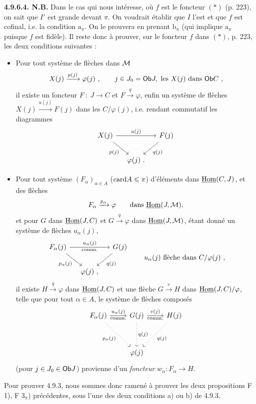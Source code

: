 \textbf{4.9.6.4. N.B.} Dans le cas qui nous intéresse, où $f$ est le foncteur $(*)$ (p. 223), on sait que $I'$ est grande devant $\pi$. On voudrait établir que $I$ l'est et que $f$ est cofinal, i.e. la condition $\mathrm{a}_\pi$. On le prouvera en prenant $\mathrm{b}_\pi$ (qui implique $\mathrm{a}_\pi$ puisque $f$ est fidèle). Il reste donc à
prouver, sur le foncteur $f$ dans $(*)$, p. 223, les deux conditions suivantes :
\begin{itemize}[label={}]
\item[F 1)] Pour tout système de flèches dans $\mathcal{M}$
\[
X(j) \xrightarrow{p(j)} \varphi(j) \ , \qquad j \in J_0 = \mathsf{Ob} J, \text{ les } X(j) \text{ dans } \mathsf{Ob} C \ ,
\]
il existe un foncteur $F \ : \ J \longrightarrow C$ et $F \xrightarrow{q} \varphi$, enfin un système de flèches $X(j) \xrightarrow{u(j)} F(j)$ dans les $C/\varphi(j)$, i.e. rendant commutatif les diagrammes %
\[
\begin{tikzcd}[column sep=small]
X(j) \arrow[rr, "u(j)"] \arrow[dr, "p(j)"'] & & F(j) \arrow[dl, "q(j)"] \\
& \varphi(j)\ . &
\end{tikzcd}
\]
\item[F $3_\pi$)] Pour tout système $(F_\alpha)_{\alpha \in A}$ ($\mathrm{card} A \leqslant \pi$) d'éléments dans $\underline{\operatorname{Hom}}(C,J)$, et des flèches %
\[
F_\alpha \xrightarrow{p_\alpha} \varphi \qquad \text{dans } \underline{\operatorname{Hom}}(J,\mathcal{M}),
\]
et pour $G$ dans $\underline{\operatorname{Hom}}(J,C)$ et $G \xrightarrow{q} \varphi$ dans $\underline{\operatorname{Hom}}(J,\mathcal{M})$, étant donné un système de flèches $u_\alpha(j)$,
\[
\begin{tikzcd}[column sep=small]
F_\alpha(j) \arrow[rr, "u_\alpha(j)", "\text{comm.}"'] \arrow[dr, "p_\alpha(j)"'] & & G(j) \arrow[dl, "q(j)"] \\
& \varphi(j)\ , &
\end{tikzcd}
\qquad u_\alpha(j) \text{ flèche dans } C/\varphi(j) \ ,
\]
il existe $H \xrightarrow{q} \varphi$ dans $\underline{\operatorname{Hom}}(J,C)$ et une flèche $G \xrightarrow{v} H$ dans $\underline{\operatorname{Hom}}(J,C)/\varphi$, telle que pour tout $\alpha \in A$, le système de flèches composés
\[
\begin{tikzcd}[row sep=huge]
F_\alpha(j) \arrow[r, "u_\alpha(j)", "\text{comm.}"'] \arrow[dr, dotted, "p_\alpha(j)"'] & G(j) \arrow[r, "v(j)", "\text{comm.}"'] \arrow[d, dotted, "q(j)"] & H(j) \arrow[dl, dotted, "q(j)"] \\
& \varphi(j) &
\end{tikzcd}
\]
(pour $j \in J_0 \in \mathsf{Ob} J$) provienne d'un \textit{foncteur} $w_\alpha : F_\alpha \longrightarrow H$. %
\end{itemize}
Pour prouver 4.9.3, nous sommes donc ramené à prouver les deux propositions F 1), F $3_\pi$) précédentes, sous l'une des deux conditions a) ou b) de 4.9.3.

